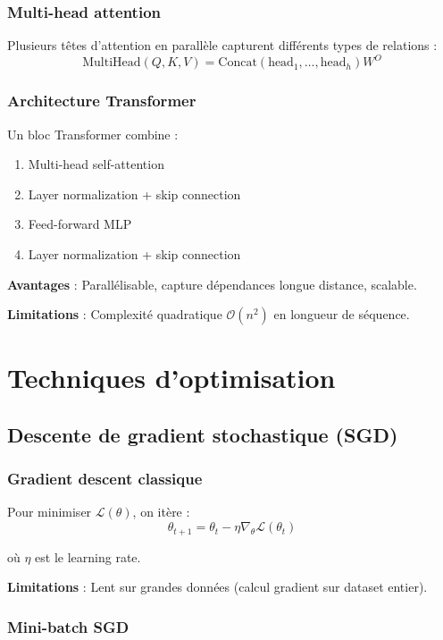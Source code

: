 \subsubsection{Multi-head attention}

Plusieurs têtes d'attention en parallèle capturent différents types de relations :
\[
\text{MultiHead}(Q, K, V) = \text{Concat}(\text{head}_1, \ldots, \text{head}_h) W^O
\]

\subsubsection{Architecture Transformer}

Un bloc Transformer combine :
\begin{enumerate}
    \item Multi-head self-attention
    \item Layer normalization + skip connection
    \item Feed-forward MLP
    \item Layer normalization + skip connection
\end{enumerate}

\textbf{Avantages} : Parallélisable, capture dépendances longue distance, scalable.

\textbf{Limitations} : Complexité quadratique $\mathcal{O}(n^2)$ en longueur de séquence.

\section{Techniques d'optimisation}

\subsection{Descente de gradient stochastique (SGD)}

\subsubsection{Gradient descent classique}

Pour minimiser $\mathcal{L}(\theta)$, on itère :
\[
\theta_{t+1} = \theta_t - \eta \nabla_\theta \mathcal{L}(\theta_t)
\]

où $\eta$ est le learning rate.

\textbf{Limitations} : Lent sur grandes données (calcul gradient sur dataset entier).

\subsubsection{Mini-batch SGD}

